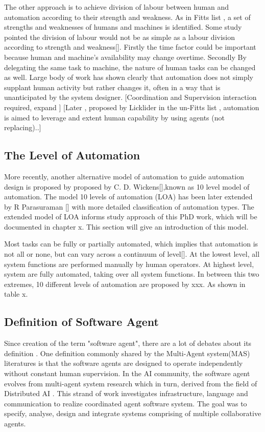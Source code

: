 The other approach is to achieve division of labour between human and automation according to their strength and weakness. As in Fitts list \cite{Fitts} , a set of strengths and weaknesses of humans and machines is identified. Some study pointed the division of labour would not be as simple as a labour division according to strength and weakness[]. Firstly the time factor could be important because human and machine's availability may change overtime. Secondly By delegating the same task to machine, the nature of human tasks can be changed as well. Large body of work has shown clearly that automation does not simply supplant human activity but rather changes it, often in a way that is unanticipated by the system designer. [Coordination and Supervision interaction required, expand ] \cite{Bradshaw2011} [Later , proposed by Licklider in the un-Fitts list \cite{Hoffman2002}, automation is aimed to leverage and extent human capability by using agents (not replacing).\cite{Bradshaw2011}.] \\


\subsection{The Level of Automation}
More recently, another alternative model of automation to guide automation design is proposed by proposed by C. D. Wickens[],known as 10 level model of automation. The model 10 levels of automation (LOA) has been later extended by R Parasuraman [] with more detailed classification of automation types. The extended model of LOA informs study approach of this PhD work, which will be documented in chapter x. This section will give an introduction of this model. 


Most tasks can be fully or partially automated, which implies that automation is not all or none, but can vary across a continuum of level[]. At the lowest level, all system functions are performed manually by human operators.  At highest level, system are fully automated, taking over all system functions. In between this two extremes, 10 different levels of automation are proposed by xxx. As shown in table x. 


\subsection{Definition of Software Agent }

Since creation of the term "software agent", there are a lot of debates about its definition . One definition commonly shared by the Multi-Agent system(MAS) literatures is that the software agents are designed to operate independently without constant human supervision. In the AI community, the software agent evolves from multi-agent system research which in turn, derived from the field of Distributed AI \cite{Vlassis2007}. This strand of work investigates infrastructure, language and communication to realize coordinated agent software system. The goal was to specify, analyse, design and integrate systems comprising of multiple collaborative agents.\cite{Nwana1996} \\

